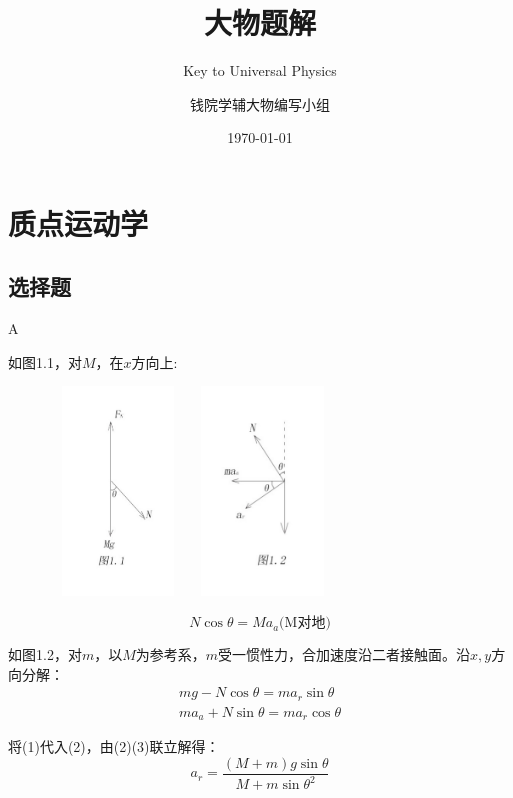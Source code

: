 \documentclass[b5paper,opensource]{qyxf-book}
\title{大物题解}
\subtitle{Key to Universal Physics}
\author{钱院学辅大物编写小组}
\date{\today}
\begin{document}
\maketitle
\tableofcontents

\chapter{质点运动学}
\section{选择题}
A

\solve 如图1.1，对$M$，在$x$方向上:
\begin{figure}[htbp]
	\centering
	\includegraphics[width=10em,height=15em]{Chp1_illus1.png}
	\quad
	\centering
	\includegraphics[width=10em,height=15em]{Chp1_illus2.png}
\end{figure}
\begin{equation}
N\cos\theta=Ma_a\text{(M对地)}
\end{equation}

如图1.2，对$m$，以$M$为参考系，$m$受一惯性力，合加速度沿二者接触面。沿$x,y$方向分解：
\begin{gather}
mg-N\cos\theta=ma_r\sin\theta\\
ma_a+N\sin\theta=ma_r\cos\theta
\end{gather}

将(1)代入(2)，由(2)(3)联立解得：
\[a_r=\dfrac{(M+m)g\sin\theta}{M+m{\sin\theta}^2}\]
\end{document}
